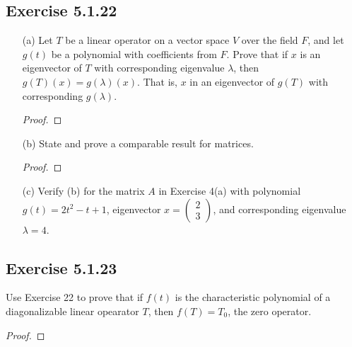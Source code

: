 \subsection*{Exercise 5.1.22}
\begin{enumerate}
    \item[(a)] Let \( T  \) be a linear operator on a vector space \( V  \) over the field \( F  \), and let \( g(t) \) be a polynomial with coefficients from \( F  \). Prove that if \( x  \) is an eigenvector of \( T  \) with corresponding eigenvalue \( \lambda  \), then \( g(T)(x) = g(\lambda)(x) \). That is, \( x  \) in an eigenvector of \( g(T) \) with corresponding \( g(\lambda) \).
        \begin{proof}
        
        \end{proof}
    \item[(b)] State and prove a comparable result for matrices.
        \begin{proof}
        
        \end{proof}
    \item[(c)] Verify (b) for the matrix \( A  \) in Exercise 4(a) with polynomial \( g(t) = 2 t^{2} - t + 1  \), eigenvector \( x = \begin{pmatrix} 
               2 \\
               3
              \end{pmatrix}  \), and corresponding eigenvalue \( \lambda = 4  \).
              \begin{solution}
              
              \end{solution}
\end{enumerate}

\subsection*{Exercise 5.1.23} Use Exercise 22 to prove that if \( f(t)  \) is the characteristic polynomial of a diagonalizable linear opearator \( T  \), then \( f(T) = {T}_{0} \), the zero operator. 
\begin{proof}

\end{proof}
